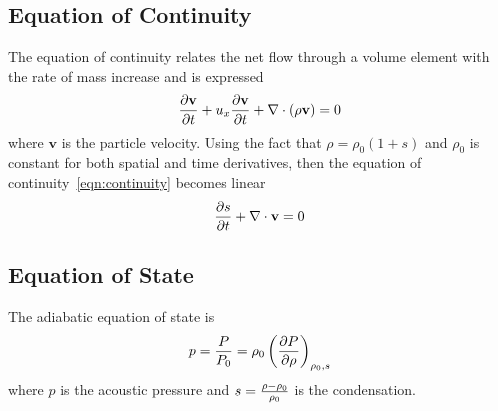 ﻿\documentclass{article}
\begin{document}
\subsection{Equation of Continuity}
The equation of continuity relates the net flow through
a volume element with the rate of mass increase and is expressed
$$
{\partial \mathbf{v}\over\partial t} + u_x{\partial \mathbf{v}\over \partial t} + \nabla \cdot(\rho \mathbf{v}) =0
\label{eqn:continuity}
$$
where $\mathbf{v}$ is the particle velocity.  Using the fact that $\rho
= \rho_0 (1+s)$ and $\rho_0$ is constant for both spatial and time
derivatives, then the  equation of continuity~\ref{eqn:continuity}
becomes linear
$$
{\partial s\over \partial t} + \nabla \cdot \mathbf{v} =0
\label{eqn:linearcontinuity}
$$

\subsection{Equation of State}
The adiabatic equation of state is 
$$  
p={P\over P_0} =\rho_0 \left ({\partial P \over\partial \rho} \right)_{\rho_0, s}
\label{eqn:eosadiabatic}
$$
where $p$ is the acoustic pressure and $s={\rho-\rho_0\over \rho_0}$ is the condensation.  
\end{document}
